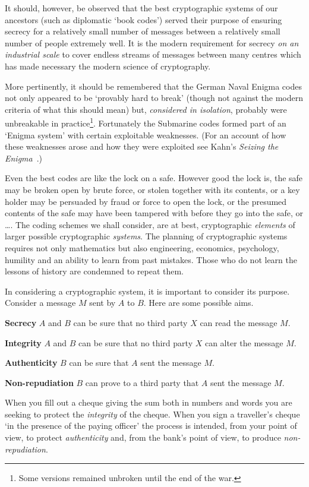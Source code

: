 It should, however, be observed that the
best cryptographic systems of our ancestors
(such as diplomatic `book codes') served their
purpose of ensuring secrecy for a relatively
small number of messages between a relatively
small number of people extremely well. It
is the modern requirement for secrecy
\emph{on an industrial scale} to cover
endless streams of messages between
many centres which has made necessary
the modern science of cryptography.

More pertinently, it should be remembered
that the German Naval Enigma codes
not only appeared to be `provably hard to break'
(though not against the modern criteria
of what this should mean) but, \emph{considered
in isolation}, probably were unbreakable
in practice\footnote{Some versions remained
unbroken until the end of the war.}.
Fortunately the Submarine codes formed part
of an `Enigma system' with certain
exploitable weaknesses. (For an account
of how these weaknesses arose and how they
were exploited see Kahn's \emph{Seizing
the Enigma}~\cite{Kahn Enigma}.)

Even the best codes are like the
lock on a safe. However good the lock is,
the safe may be broken open by brute force,
or stolen together with its contents,
or a key holder may be
persuaded by fraud or force to open
the lock, or the presumed
contents of the safe
may have been tampered with before they
go into the safe, or \dots.
The coding schemes we shall consider,
are at best, cryptographic \emph{elements}
of larger possible cryptographic \emph{systems}.
The planning of cryptographic systems
requires not only mathematics but also
engineering, economics, psychology,
humility
and an ability to learn from past mistakes.
Those who do not learn the lessons of history are
condemned to repeat them.

In considering a cryptographic system, it
is important to consider its purpose.
Consider a message $M$ sent by $A$ to $B$.
Here are some possible aims.

\noindent
{\bf Secrecy} $A$ and $B$ can be sure that no
third party $X$ can read the message $M$.

\noindent
{\bf Integrity} $A$ and $B$ can be sure that no
third party $X$ can alter the message $M$.

\noindent
{\bf Authenticity} $B$ can be sure that $A$
sent the message $M$.

\noindent
{\bf Non-repudiation} $B$ can prove to
a third party that $A$
sent the message $M$.

When you fill out a cheque giving the sum both
in numbers and words you are seeking to protect
the \emph{integrity} of the cheque. When you
sign a traveller's cheque `in the presence of
the paying officer' the process is intended,
from your point of view,
to protect \emph{authenticity} and, from
the bank's point of view, to produce
\emph{non-repudiation}.

